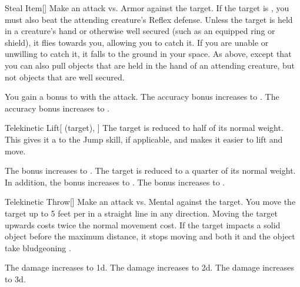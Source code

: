 \lowercase{\hypertarget{spell:Steal Item}{}}\label{spell:Steal Item}
\begin{freeability}[Rank 1]{\hypertarget{spell:Steal Item}{Steal Item}}[]
Make an attack vs. Armor against the target.
If the target is , you must also beat the attending creature's Reflex defense.
\hit Unless the target is held in a creature's hand or otherwise well secured (such as an equipped ring or shield), it flies towards you, allowing you to catch it.
If you are unable or unwilling to catch it, it falls to the ground in your space.
\crit As above, except that you can also pull objects that are held in the hand of an attending creature, but not objects that are well secured.

\rankline
{} You gain a  bonus to  with the attack.
 The accuracy bonus increases to .
 The accuracy bonus increases to .
\end{freeability}
\vspace{0.25em}



\lowercase{\hypertarget{spell:Telekinetic Lift}{}}\label{spell:Telekinetic Lift}
\begin{attuneability}[Rank 1]{\hypertarget{spell:Telekinetic Lift}{Telekinetic Lift}}[ (target), ]
The target is reduced to half of its normal weight.
This gives it a   to the Jump skill, if applicable, and makes it easier to lift and move.

\rankline
{} The bonus increases to .
 The target is reduced to a quarter of its normal weight. In addition, the bonus increases to .
 The bonus increases to .
\end{attuneability}
\vspace{0.25em}



\lowercase{\hypertarget{spell:Telekinetic Throw}{}}\label{spell:Telekinetic Throw}
\begin{freeability}[Rank 1]{\hypertarget{spell:Telekinetic Throw}{Telekinetic Throw}}[]
Make an attack vs. Mental against the target.
\hit You move the target up to 5 feet per  in a straight line in any direction.
Moving the target upwards costs twice the normal movement cost.
If the target impacts a solid object before the maximum distance, it stops moving and both it and the object take bludgeoning .

\rankline
{} The damage increases to  \plus1d.
 The damage increases to  \plus2d.
 The damage increases to  \plus3d.
\end{freeability}
\vspace{0.25em}



